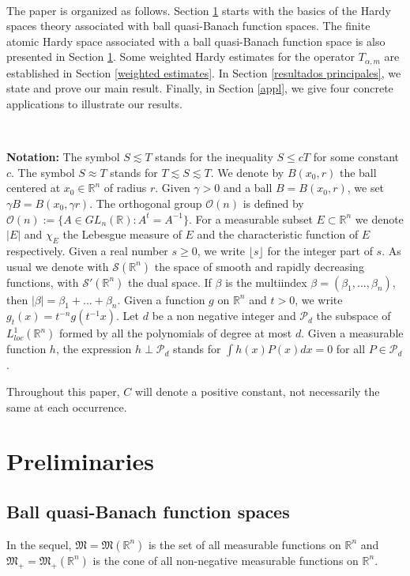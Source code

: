 \documentclass[oneside,10pt]{article}
\begin{document}
\

The paper is organized as follows. Section \ref{basico} starts with the basics of the Hardy spaces theory associated with ball quasi-Banach function spaces. The finite atomic Hardy space associated with a ball quasi-Banach function space is also presented in Section \ref{basico}. Some weighted Hardy estimates for the operator $T_{\alpha, m}$ are established in Section \ref{weighted estimates}. In Section 
\ref{resultados principales}, we state and prove our main result. Finally, in Section \ref{appl}, we give four concrete applications to illustrate our results.

\

\textbf{Notation:} The symbol $S \lesssim T$ stands for the inequality $S \leq cT$ for some constant $c$. The symbol $S \approx T$ 
stands for $T \lesssim S \lesssim T$. We denote by $B(x_0, r)$ the ball centered at $x_0 \in \mathbb{R}^{n}$ of radius $r$. Given 
$\gamma >0$ and a ball $B = B(x_0, r)$, we set $\gamma B = B(x_0, \gamma r)$. The orthogonal group $\mathcal{O}(n)$ is defined by 
$\mathcal{O}(n):=\{ A \in GL_n(\mathbb{R}) : A^{t}= A^{-1} \}$. For a measurable subset $E \subset \mathbb{R}^{n}$ we denote $|E|$ and 
$\chi_E$ the Lebesgue measure of $E$ and the characteristic function of $E$ respectively. Given a real number $s \geq 0$, we write 
$\lfloor s \rfloor$ for the integer part of $s$. As usual we denote with $\mathcal{S}(\mathbb{R}^{n})$ the space of smooth and rapidly decreasing functions, with $\mathcal{S}'(\mathbb{R}^{n})$  the dual space. If $\beta$ is the multiindex $\beta=(\beta_1, ..., \beta_n)$, then 
$|\beta| = \beta_1 + ... + \beta_n$. Given a function $g$ on $\mathbb{R}^n$ and $t > 0$, we write $g_t(x) = t^{-n} g(t^{-1} x)$. Let $d$ be a non negative integer and $\mathcal{P}_{d}$ the subspace of $L^{1}_{loc}(\mathbb{R}^{n})$ formed by all the polynomials of degree at most $d$. Given a measurable function $h$, the expression $h \perp \mathcal{P}_{d}$ stands for $\int h(x) P(x) dx = 0$ for all $P \in \mathcal{P}_{d}$.

Throughout this paper, $C$ will denote a positive constant, not necessarily the same at each occurrence.



\section{Preliminaries} \label{basico}


\subsection{Ball quasi-Banach function spaces} In the sequel, $\mathfrak{M} = \mathfrak{M}(\mathbb{R}^n)$ is the set of all measurable functions on $\mathbb{R}^n$ and $\mathfrak{M}_{+} = \mathfrak{M}_{+}(\mathbb{R}^n)$ is the cone of all non-negative measurable functions on $\mathbb{R}^n$.
\end{document}
